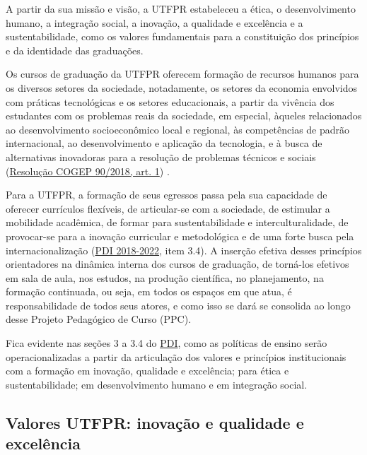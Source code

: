 A partir da sua missão e visão, a UTFPR estabeleceu a ética, o desenvolvimento humano, a integração social, a inovação, a qualidade e excelência e a sustentabilidade, como os valores fundamentais para a constituição dos princípios e da identidade das graduações.

Os cursos de graduação da UTFPR oferecem formação de recursos humanos para os diversos setores da sociedade, notadamente, os setores da economia envolvidos com práticas tecnológicas e os setores educacionais, a partir da vivência dos estudantes com os problemas reais da sociedade, em especial, àqueles relacionados ao desenvolvimento socioeconômico local e regional, às competências de padrão internacional, ao desenvolvimento e aplicação da tecnologia, e à busca de alternativas inovadoras para a resolução de problemas técnicos e sociais (\href{https://sei.utfpr.edu.br/sei/publicacoes/controlador_publicacoes.php?acao=publicacao_visualizar&id_documento=888276&id_orgao_publicacao=0}{Resolução COGEP 90/2018, art. 1\textordmasculine}) \nocite{cogep90}.

Para a UTFPR, a formação de seus egressos passa pela sua capacidade de oferecer currículos flexíveis, de articular-se com a sociedade, de estimular a mobilidade acadêmica, de formar para sustentabilidade e interculturalidade, de provocar-se para a inovação curricular e metodológica e de uma forte busca pela internacionalização (\href{https://cloud.utfpr.edu.br/index.php/s/15P0OcMLMdt9Rv7}{PDI 2018-2022}, item 3.4\nocite{pdiutfpr}). A inserção efetiva desses princípios orientadores na dinâmica interna dos cursos de graduação, de torná-los efetivos em sala de aula, nos estudos, na produção científica, no planejamento, na formação continuada, ou seja, em todos os espaços em que atua, é responsabilidade de todos seus atores, e como isso se dará se consolida ao longo desse Projeto Pedagógico de Curso (PPC).


Fica evidente nas seções 3 a 3.4 do \href{https://cloud.utfpr.edu.br/index.php/s/15P0OcMLMdt9Rv7}{PDI}, como as políticas de ensino serão operacionalizadas a partir da articulação dos valores e princípios institucionais com a formação em inovação, qualidade e excelência; para ética e sustentabilidade; em desenvolvimento humano e em integração social.

\subsection{Valores UTFPR: inovação e qualidade e excelência}


